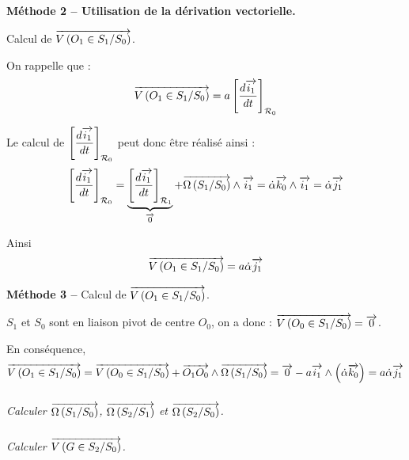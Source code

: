\documentclass[10pt,oneside]{article}
\begin{document}
{\begin{corrige}
\textbf{Méthode 2 -- Utilisation de la dérivation vectorielle.}

Calcul de $\overrightarrow{V\left( {O_1} \in {S_1}/{S_0}\right)}$.

On rappelle que :
$$
\overrightarrow{V\left( {O_1} \in {S_1}/{S_0}\right)} 
= a \left[\dfrac{d  \overrightarrow{i_1} }{dt}\right]_{\mathcal{R}_0}
$$

Le calcul de $\left[\dfrac{d  \overrightarrow{i_1} }{dt}\right]_{\mathcal{R}_0}$ peut donc être réalisé ainsi : 
$$ 
\left[\dfrac{d  \overrightarrow{i_1} }{dt}\right]_{\mathcal{R}_0} = 
\underbrace{\left[\dfrac{d  \overrightarrow{i_1} }{dt}\right]_{\mathcal{R}_1}}_{\overrightarrow{0}} + \overrightarrow{\Omega\left( {S_1}/{S_0}\right)}\wedge \overrightarrow{i_1}
=\dot{\alpha}\overrightarrow{k_0}  \wedge \overrightarrow{i_1}
=\dot{\alpha} \overrightarrow{j_1}
$$

Ainsi 
$$
\overrightarrow{V\left( {O_1} \in {S_1}/{S_0}\right)} 
= a \dot{\alpha} \overrightarrow{j_1}
$$

\textbf{Méthode 3 -- }
Calcul de $\overrightarrow{V\left( {O_1} \in {S_1}/{S_0}\right)}$.

$S_1$ et $S_0$ sont en liaison pivot de centre $O_0$, on a donc :  $\overrightarrow{V\left( {O_0} \in {S_1}/{S_0}\right)}=\overrightarrow{0}$.

En conséquence, 
$$
\overrightarrow{V\left( {O_1} \in {S_1}/{S_0}\right)} = \overrightarrow{V\left( {O_0} \in {S_1}/{S_0}\right)} + \overrightarrow{O_1O_0}\wedge   \overrightarrow{\Omega\left( {S_1}/{S_0}\right)} = \overrightarrow{0} - a \overrightarrow{i_1} \wedge \left( \dot{\alpha}\overrightarrow{k_0} \right)
=a \dot{\alpha}\overrightarrow{j_1}
$$

\end{corrige}}{}


\subparagraph{}
\textit{Calculer $\overrightarrow{\Omega\left( {S_1}/{S_0}\right)}$, $\overrightarrow{\Omega\left( {S_2}/{S_1}\right)}$ et $\overrightarrow{\Omega\left( {S_2}/{S_0}\right)}$.}



\subparagraph{}
\textit{Calculer $\overrightarrow{V\left( {G} \in {S_2}/{S_0}\right)}$.}
\end{document}
